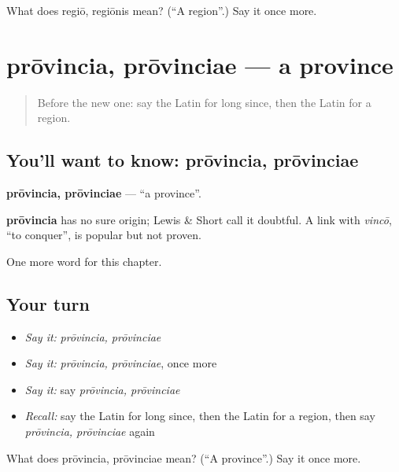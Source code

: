 \begin{tcolorbox}[breakable,colback=teal!4,colframe=teal!35!black,title={Before you move on}]
What does regiō, regiōnis mean? (\textquotedblleft{}A region\textquotedblright{}.) Say it once more.
\end{tcolorbox}
\section[prōvincia, prōvinciae]{prōvincia, prōvinciae — a province}

\label{lesson:LA-C209-provincia}



\begin{quote}
Before the new one: say the Latin for long since, then the Latin for a region.
\end{quote}

\subsection*{You'll want to know: prōvincia, prōvinciae}
\textbf{prōvincia, prōvinciae} — \textquotedblleft{}a province\textquotedblright{}.

\begin{cousinweb}
\textbf{prōvincia} has no sure origin; Lewis \& Short call it doubtful. A link with \emph{vincō}, \textquotedblleft{}to conquer\textquotedblright{}, is popular but not proven.
\end{cousinweb}

\begin{grammarlens}[title={What you've built}]
One more word for this chapter.
\end{grammarlens}

\subsection*{Your turn}
\begin{itemize}
\raggedright
  \item \emph{Say it:} \emph{prōvincia, prōvinciae}
  \item \emph{Say it:} \emph{prōvincia, prōvinciae}, once more
  \item \emph{Say it:} say \emph{prōvincia, prōvinciae}
  \item \emph{Recall:} say the Latin for long since, then the Latin for a region, then say \emph{prōvincia, prōvinciae} again
\end{itemize}

\begin{tcolorbox}[breakable,colback=teal!4,colframe=teal!35!black,title={Before you move on}]
What does prōvincia, prōvinciae mean? (\textquotedblleft{}A province\textquotedblright{}.) Say it once more.
\end{tcolorbox}
